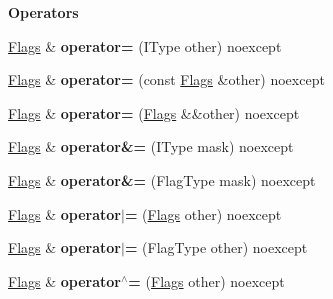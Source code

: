 \begin{Indent}\textbf{ Operators}\par
\begin{DoxyCompactItemize}
\item 
\mbox{\label{classrev_1_1_flags_a7543d0fd5ec94994049a6ed65170ba6b}} 
\mbox{\hyperlink{classrev_1_1_flags}{Flags}} \& {\bfseries operator=} (I\+Type other) noexcept
\item 
\mbox{\label{classrev_1_1_flags_a3178fb169b671b6b52d453bd011c7b14}} 
\mbox{\hyperlink{classrev_1_1_flags}{Flags}} \& {\bfseries operator=} (const \mbox{\hyperlink{classrev_1_1_flags}{Flags}} \&other) noexcept
\item 
\mbox{\label{classrev_1_1_flags_a1ac32c3fda77e12699d105fb9fdda27e}} 
\mbox{\hyperlink{classrev_1_1_flags}{Flags}} \& {\bfseries operator=} (\mbox{\hyperlink{classrev_1_1_flags}{Flags}} \&\&other) noexcept
\item 
\mbox{\label{classrev_1_1_flags_a62a33396a2319aa6b5ade49ad91fb485}} 
\mbox{\hyperlink{classrev_1_1_flags}{Flags}} \& {\bfseries operator\&=} (I\+Type mask) noexcept
\item 
\mbox{\label{classrev_1_1_flags_ac738a6e1efaad117fe3470b88399469a}} 
\mbox{\hyperlink{classrev_1_1_flags}{Flags}} \& {\bfseries operator\&=} (Flag\+Type mask) noexcept
\item 
\mbox{\label{classrev_1_1_flags_a6a00a0d3bd2a0f3a9662cb38b5e7e0cb}} 
\mbox{\hyperlink{classrev_1_1_flags}{Flags}} \& {\bfseries operator$\vert$=} (\mbox{\hyperlink{classrev_1_1_flags}{Flags}} other) noexcept
\item 
\mbox{\label{classrev_1_1_flags_ae9f0324f441088189a869b7a01225175}} 
\mbox{\hyperlink{classrev_1_1_flags}{Flags}} \& {\bfseries operator$\vert$=} (Flag\+Type other) noexcept
\item 
\mbox{\label{classrev_1_1_flags_a00be7ad5a9b3df3435a8a2f3cb314e8a}} 
\mbox{\hyperlink{classrev_1_1_flags}{Flags}} \& {\bfseries operator$^\wedge$=} (\mbox{\hyperlink{classrev_1_1_flags}{Flags}} other) noexcept
\item 

\end{DoxyCompactItemize}
\end{Indent}
